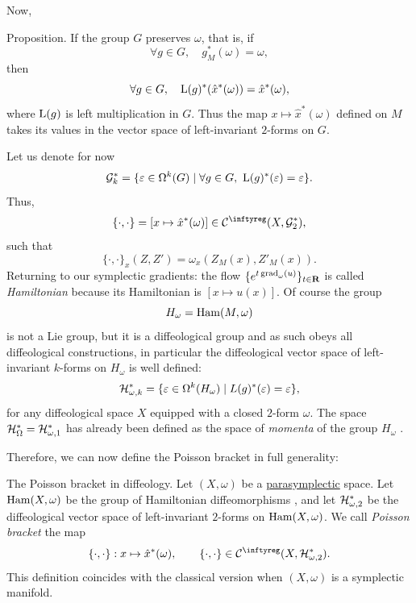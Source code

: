 Now,

\begin{Article}{Proposition.}{}
  If the group $G$ preserves $\omega$,
  that is,
  if
  $$
    \forall g \in G, \quad g_M^*(\omega) = \omega,
  $$
  then
  $$
    \forall g \in G, \quad \operatorname{L}(g)^*(\hat x^*(\omega)) = \hat x^*(\omega),
  $$
  where $\operatorname{L}(g)$ is left multiplication in $G$.
  Thus the map $x \mapsto \hat x^*(\omega)$ defined on $M$ takes its values in the vector space of left-invariant $2$-forms on $G$.
\end{Article}

Let us denote for now
$$
  \mathcal{G}_k^* = \{ \varepsilon \in \Omega^k(G) \mid \forall g \in G, \ \operatorname{L}(g)^*(\varepsilon) = \varepsilon \}.
$$
Thus,
$$
  \{\cdot,\cdot\} = [x \mapsto \hat x^*(\omega)] \in \Cinfty(X, \cG_2^*),
$$
such that
$$
  \{\cdot,\cdot\}_x(Z,Z') = \omega_x(Z_M(x), Z'_M(x)).
$$
Returning to our symplectic gradients:
the flow $\{e^{t\operatorname{grad}_\omega(u)}\}_{t \in \mathbf{R}}$ is called \emph{Hamiltonian} because its Hamiltonian \cite[\textsection\,9.15]{PIZ13} is $[x \mapsto u(x)]$.
Of course the group
$$
  H_\omega = \operatorname{Ham}(M,\omega)
$$
is not a Lie group,
but it is a diffeological group and as such obeys all diffeological constructions,
in particular the diffeological vector space of left-invariant $k$-forms on $H_\omega$ is well defined:
$$
  \mathcal{H}_{\omega,k}^* = \{ \varepsilon \in \Omega^k(H_\omega) \mid L(g)^*(\varepsilon) = \varepsilon \},
$$
for any diffeological space $X$ equipped with a closed $2$-form $\omega$.
The space $\mathcal{H}_\Omega^* = \mathcal{H}_{\omega,1}^*$ has already been defined as the space of \emph{momenta} of the group $H_\omega$ \cite[\textsection\,7.12]{PIZ13}.

Therefore,
we can now define the Poisson bracket in full generality:

\begin{Article}{The Poisson bracket in diffeology.}{}
  Let $(X,\omega)$ be a \uline{parasymplectic} space.
  Let $\operatorname{Ham}(X,\omega)$ be the group of Hamiltonian diffeomorphisms \cite[\textsection\,9.15]{PIZ13},
  and let $\mathcal{H}_{\omega,2}^*$ be the diffeological vector space of left-invariant $2$-forms on $\operatorname{Ham}(X,\omega)$.
  We call \emph{Poisson bracket} the map
  $$
    \{\cdot, \cdot\} : x \mapsto \hat x^*(\omega),
    \qquad
    \{\cdot, \cdot\} \in \Cinfty(X, \cH_{\omega,2}^*).
  $$
  This definition coincides with the classical version when $(X,\omega)$ is a symplectic manifold.
\end{Article}


